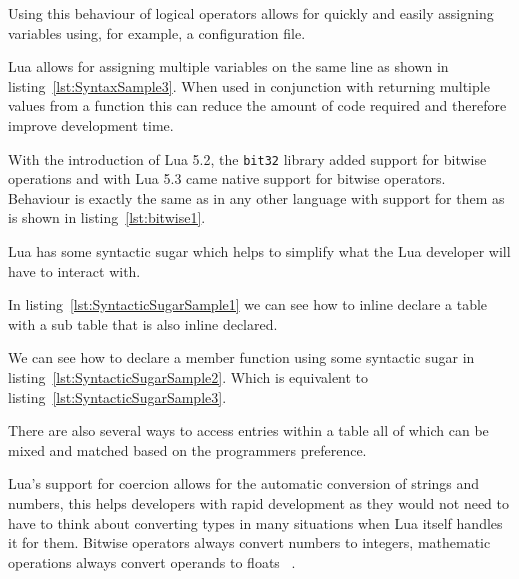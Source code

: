 \documentclass[11pt,a4paper,titlepage]{article}
\begin{document}
			Using this behaviour of logical operators allows for quickly and easily assigning variables using, for example, a configuration file.

			Lua allows for assigning multiple variables on the same line as shown in listing~\ref{lst:SyntaxSample3}. When used in conjunction with returning multiple values from a function this can reduce the amount of code required and therefore improve development time.
			 

			With the introduction of Lua 5.2, the \texttt{bit32} library added support for bitwise operations and with Lua 5.3 came native support for bitwise operators. Behaviour is exactly the same as in any other language with support for them as is shown in listing~\ref{lst:bitwise1}.
			 

			Lua has some syntactic sugar which helps to simplify what the Lua developer will have to interact with.
			
			
			In listing~\ref{lst:SyntacticSugarSample1} we can see how to inline declare a table with a sub table that is also inline declared.

			
			We can see how to declare a member function using some syntactic sugar in listing~\ref{lst:SyntacticSugarSample2}. Which is equivalent to listing~\ref{lst:SyntacticSugarSample3}.

			

			There are also several ways to access entries within a table all of which can be mixed and matched based on the programmers preference.

			

			Lua's support for coercion allows for the automatic conversion of strings and numbers, this helps developers with rapid development as they would not need to have to think about converting types in many situations when Lua itself handles it for them. Bitwise operators always convert numbers to integers, mathematic operations always convert operands to floats ~\cite{LuaMan}.
			
\end{document}
